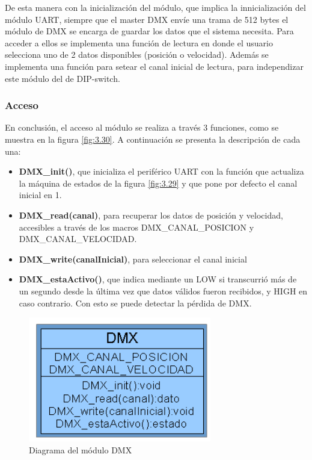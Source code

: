 De esta manera con la inicialización del módulo, que implica la innicialización del módulo UART, siempre que el master DMX envíe una trama de 512 bytes el módulo de DMX se encarga de guardar los datos que el sistema necesita. Para acceder a ellos se implementa una función de lectura en donde el usuario selecciona uno de 2 datos disponibles (posición o velocidad). Además se implementa una función para setear el canal inicial de lectura, para independizar este módulo del de DIP-switch.

\subsubsection{Acceso}
En conclusión, el acceso al módulo se realiza a través 3 funciones, como se muestra en la figura \ref{fig:3.30}. A continuación se presenta la descripción de cada una:
\begin{itemize}
	\item \textbf{DMX\_init()}, que inicializa el periférico UART con la función que actualiza la máquina de estados de la figura \ref{fig:3.29} y que pone por defecto el canal inicial en 1.
	\item \textbf{DMX\_read(canal)}, para recuperar los datos de posición y velocidad, accesibles a través de los macros DMX\_CANAL\_POSICION y DMX\_CANAL\_VELOCIDAD.
	\item \textbf{DMX\_write(canalInicial)}, para seleccionar el canal inicial
	\item \textbf{DMX\_estaActivo()}, que indica mediante un LOW si transcurrió más de un segundo desde la última vez que datos válidos fueron recibidos, y HIGH en caso contrario. Con esto se puede detectar la pérdida de DMX.
\end{itemize}

\begin{figure}[!ht]
	\centering
	\includegraphics[width=8cm,scale=1]{resources/3_30-moduloDMX.png}
	\caption{Diagrama del módulo DMX}
	\label{fig:\thefigure}
\end{figure}
 

